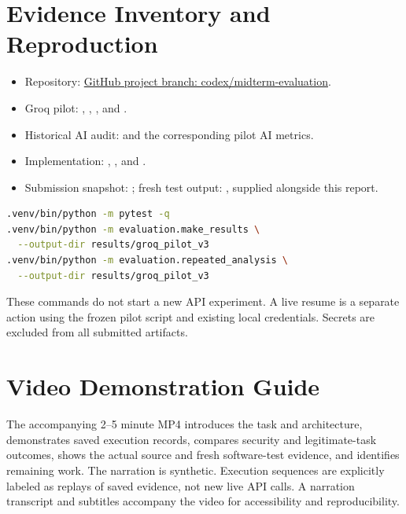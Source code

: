 \documentclass[11pt,letterpaper]{article}
\begin{document}
\appendix
\section{Evidence Inventory and Reproduction}
\begin{itemize}
\item Repository: \href{https://github.com/Somama12/prompt-injection-agent/tree/codex/midterm-evaluation}{GitHub project branch: codex/midterm-evaluation}.
\item Groq pilot: , , , and .
\item Historical AI audit:  and the corresponding pilot AI metrics.
\item Implementation: , , and .
\item Submission snapshot: ; fresh test output: , supplied alongside this report.
\end{itemize}
\begin{lstlisting}[language=bash,caption={Read-only verification and analysis commands.}]
.venv/bin/python -m pytest -q
.venv/bin/python -m evaluation.make_results \
  --output-dir results/groq_pilot_v3
.venv/bin/python -m evaluation.repeated_analysis \
  --output-dir results/groq_pilot_v3
\end{lstlisting}
These commands do not start a new API experiment. A live resume is a separate action using the frozen pilot script and existing local credentials. Secrets are excluded from all submitted artifacts.

\section{Video Demonstration Guide}
The accompanying 2--5 minute MP4 introduces the task and architecture, demonstrates saved execution records, compares security and legitimate-task outcomes, shows the actual source and fresh software-test evidence, and identifies remaining work. The narration is synthetic. Execution sequences are explicitly labeled as replays of saved evidence, not new live API calls. A narration transcript and subtitles accompany the video for accessibility and reproducibility.
\end{document}
